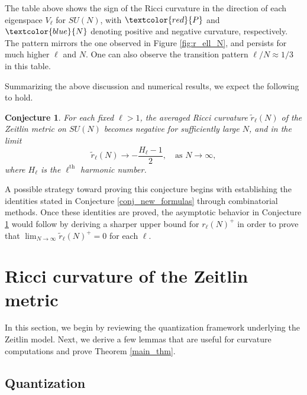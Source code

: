 \documentclass[11pt]{amsart}
\numberwithin{equation}{section}
\newtheorem{conjecture}{Conjecture}
\theoremstyle{definition}
\newcommand{\p}{\textcolor{red}{P}}
\newcommand{\n}{\textcolor{blue}{N}}
\begin{document}
\medskip

The table above shows the sign of the Ricci curvature in the direction of each eigenspace $V_\ell$ for $SU(N)$, with $\p$ and $\n$ denoting positive and negative curvature, respectively. The pattern mirrors the one observed in Figure \ref{fig:r_ell_N}, and persists for much higher $\ell$ and $N$. One can also observe the transition pattern $\ell/N \approx 1/3$ in this table.

\bigskip
Summarizing the above discussion and numerical results, we expect the following to hold.

\begin{conjecture}\label{conjecture_ricci}
For each fixed $\ell > 1$, the averaged Ricci curvature $\widetilde{r}_{\ell}(N)$ of the Zeitlin metric on $SU(N)$ becomes negative for sufficiently large $N$, and in the limit
\begin{equation}
\widetilde{r}_{\ell}(N) \rightarrow -\frac{H_{\ell}-1}{2}, \quad \text{as $N \rightarrow \infty$}, 
\end{equation}
where $H_{\ell}$ is the $\ell^{\text{th}}$ harmonic number.
\end{conjecture}

A possible strategy toward proving this conjecture begins with establishing the identities stated in Conjecture \ref{conj_new_formulas} through combinatorial methods. Once these identities are proved, the asymptotic behavior in Conjecture \ref{conjecture_ricci} would follow by deriving a  
sharper upper bound for $r_{\ell}(N)^+$ in order to prove that $\lim_{N\to\infty} \tilde{r}_{\ell}(N)^+=0$ for each $\ell$. 



\section{Ricci curvature of the Zeitlin metric}\label{sec_ricci_finite_N}

In this section, we begin by reviewing the quantization framework underlying the Zeitlin model. Next, we derive a few lemmas that are useful for curvature computations and prove Theorem \ref{main_thm}.

\subsection{Quantization}
\end{document}
